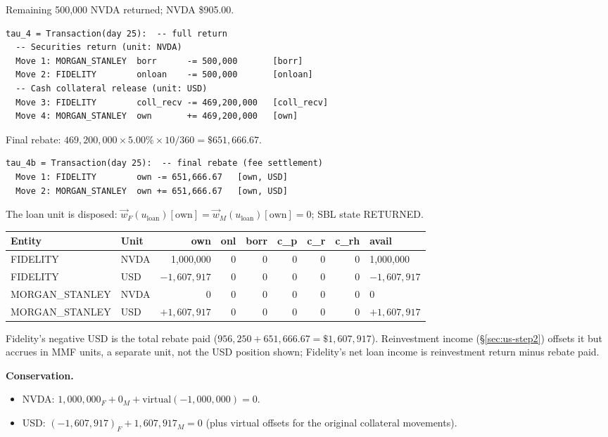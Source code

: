 Remaining 500{,}000 NVDA returned; NVDA \$905.00.

\begin{lstlisting}
tau_4 = Transaction(day 25):  -- full return
  -- Securities return (unit: NVDA)
  Move 1: MORGAN_STANLEY  borr      -= 500,000       [borr]
  Move 2: FIDELITY        onloan    -= 500,000       [onloan]
  -- Cash collateral release (unit: USD)
  Move 3: FIDELITY        coll_recv -= 469,200,000   [coll_recv]
  Move 4: MORGAN_STANLEY  own       += 469,200,000   [own]
\end{lstlisting}

\noindent Final rebate: $469{,}200{,}000 \times 5.00\% \times 10/360 = \$651{,}666.67$.

\begin{lstlisting}
tau_4b = Transaction(day 25):  -- final rebate (fee settlement)
  Move 1: FIDELITY        own -= 651,666.67   [own, USD]
  Move 2: MORGAN_STANLEY  own += 651,666.67   [own, USD]
\end{lstlisting}

\noindent The loan unit is disposed: $\vec{w}_F(u_{\mathrm{loan}})[\mathrm{own}] = \vec{w}_M(u_{\mathrm{loan}})[\mathrm{own}] = 0$; SBL state RETURNED.

\begin{center}\small
\begin{tabular}{l l r r r r r r l}
\toprule
\textbf{Entity} & \textbf{Unit} & own & onl & borr & c\_p & c\_r & c\_rh & avail \\
\midrule
FIDELITY & NVDA & 1{,}000{,}000 & 0 & 0 & 0 & 0 & 0 & 1{,}000{,}000 \\
FIDELITY & USD & $-1{,}607{,}917$ & 0 & 0 & 0 & 0 & 0 & $-1{,}607{,}917$ \\
\midrule
MORGAN\_STANLEY & NVDA & 0 & 0 & 0 & 0 & 0 & 0 & 0 \\
MORGAN\_STANLEY & USD & $+1{,}607{,}917$ & 0 & 0 & 0 & 0 & 0 & $+1{,}607{,}917$ \\
\bottomrule
\end{tabular}
\end{center}

\noindent Fidelity's negative USD is the total rebate paid ($956{,}250 + 651{,}666.67 = \$1{,}607{,}917$). Reinvestment income (\S\ref{sec:us-step2}) offsets it but accrues in MMF units, a separate unit, not the USD position shown; Fidelity's net loan income is reinvestment return minus rebate paid.

\medskip
\noindent\textbf{Conservation.}
\begin{itemize}[nosep]
\item NVDA: $1{,}000{,}000_F + 0_M + \text{virtual}(-1{,}000{,}000) = 0$. \checkmark
\item USD: $(-1{,}607{,}917)_F + 1{,}607{,}917_M = 0$ (plus virtual offsets for the original collateral movements). \checkmark
\end{itemize}

